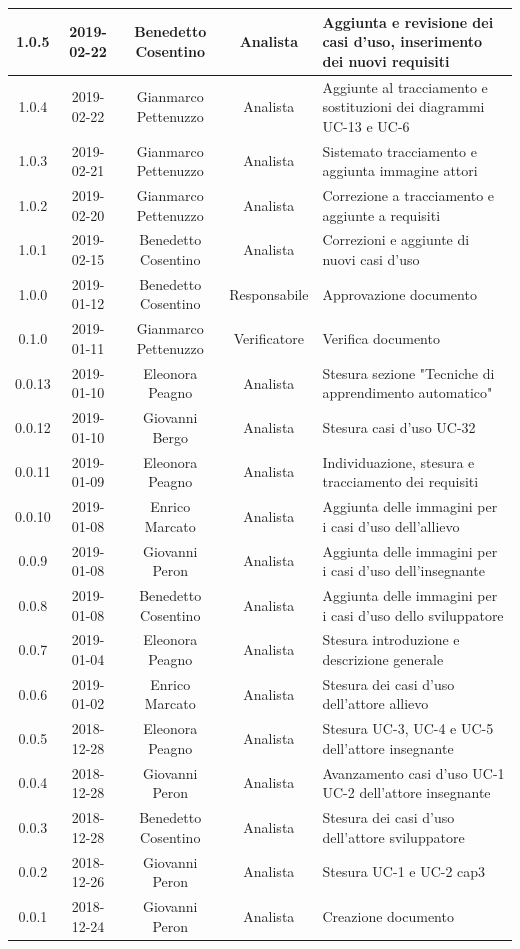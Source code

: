 \documentclass[11pt,a4paper]{article}
\begin{document}
{\begin{tabularx}{\textwidth}{ c | c | c | c | X }
		1.0.5 & 2019-02-22 & Benedetto Cosentino & Analista & Aggiunta e revisione dei casi d'uso, inserimento dei nuovi requisiti\\ \hline
		1.0.4 & 2019-02-22 & Gianmarco Pettenuzzo & Analista & Aggiunte al tracciamento e sostituzioni dei diagrammi UC-13 e UC-6\\ \hline
		1.0.3 & 2019-02-21 & Gianmarco Pettenuzzo & Analista & Sistemato tracciamento e aggiunta immagine attori\\ \hline
		1.0.2 & 2019-02-20 & Gianmarco Pettenuzzo & Analista & Correzione a tracciamento e aggiunte a requisiti\\ \hline
		1.0.1 & 2019-02-15 & Benedetto Cosentino & Analista & Correzioni e aggiunte di nuovi casi d'uso \\ \hline
		1.0.0 & 2019-01-12 & Benedetto Cosentino & Responsabile & Approvazione documento \\ \hline
		0.1.0 & 2019-01-11 & Gianmarco Pettenuzzo & Verificatore & Verifica documento \\ \hline
		0.0.13 & 2019-01-10 & Eleonora Peagno & Analista & Stesura sezione "Tecniche di apprendimento automatico" \\ \hline
		0.0.12 & 2019-01-10 & Giovanni Bergo & Analista & Stesura casi d'uso UC-32 \\ \hline
		0.0.11 & 2019-01-09 & Eleonora Peagno & Analista & Individuazione, stesura e tracciamento dei requisiti \\ \hline
		0.0.10 & 2019-01-08 & Enrico Marcato & Analista & Aggiunta delle immagini per i casi d'uso dell'allievo\\ \hline
		0.0.9 & 2019-01-08 & Giovanni Peron & Analista & Aggiunta delle immagini per i casi d'uso dell'insegnante\\ \hline
		0.0.8 & 2019-01-08 & Benedetto Cosentino & Analista & Aggiunta delle immagini per i casi d'uso dello sviluppatore\\ \hline
		0.0.7 & 2019-01-04 & Eleonora Peagno & Analista & Stesura introduzione e descrizione generale\\ \hline
		0.0.6 & 2019-01-02 & Enrico Marcato & Analista & Stesura dei casi d'uso dell'attore allievo\\ \hline
		0.0.5 & 2018-12-28 & Eleonora Peagno & Analista & Stesura UC-3, UC-4 e UC-5 dell'attore insegnante\\ \hline
		0.0.4 & 2018-12-28 & Giovanni Peron & Analista & Avanzamento casi d'uso UC-1 UC-2 dell'attore insegnante\\ \hline
		0.0.3 & 2018-12-28 & Benedetto Cosentino & Analista & Stesura dei casi d'uso dell'attore sviluppatore\\ \hline
		0.0.2 & 2018-12-26 & Giovanni Peron & Analista & Stesura UC-1 e UC-2 cap3\\ \hline
		0.0.1 & 2018-12-24 & Giovanni Peron & Analista & Creazione documento\\ \hline
	\end{tabularx}
	\newpage
	\tableofcontents
	\listoffigures
	\listoftables
	\newpage	
}
\end{document}
